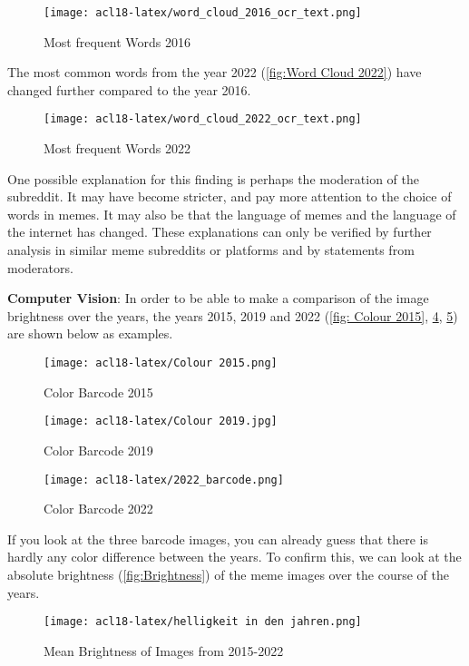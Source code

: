 \documentclass[11pt,a4paper]{article}
\begin{document}
\begin{figure}[H]
    \centering
    \texttt{[image: acl18-latex/word\_cloud\_2016\_ocr\_text.png]}
    \caption{Most frequent Words 2016}
    \label{fig:Word Cloud 2019}
\end{figure}

The most common words from the year 2022 (\autoref{fig:Word Cloud 2022}) have changed further compared to the year 2016.
\begin{figure}[H]
    \centering
    \texttt{[image: acl18-latex/word\_cloud\_2022\_ocr\_text.png]}
    \caption{Most frequent Words 2022}
    \label{fig:Word Cloud 2022}
\end{figure}

One possible explanation for this finding is perhaps the moderation of the subreddit. It may have become stricter, and pay more attention to the choice of words in memes. It may also be that the language of memes and the language of the internet has changed.
These explanations can only be verified by further analysis in similar meme subreddits or platforms and by statements from moderators.
\newline \par \textbf{Computer Vision}: In order to be able to make a comparison of the image brightness over the years, the years 2015, 2019 and 2022 (\autoref{fig: Colour 2015}, \ref{fig: Colour 2019}, \ref{fig: Colour 2022}) are shown below as examples.
\begin{figure}[H]
    \centering
    \texttt{[image: acl18-latex/Colour 2015.png]}
    \caption{Color Barcode 2015}
    \label{fig: Colour 2015}
\end{figure}
\begin{figure}[H]
    \centering
    \texttt{[image: acl18-latex/Colour 2019.jpg]}
    \caption{Color Barcode 2019}
    \label{fig: Colour 2019}
\end{figure}
\begin{figure}[H]
    \centering
    \texttt{[image: acl18-latex/2022\_barcode.png]}
    \caption{Color Barcode 2022}
    \label{fig: Colour 2022}
\end{figure}
If you look at the three barcode images, you can already guess that there is hardly any color difference between the years. To confirm this, we can look at the absolute brightness (\autoref{fig:Brightness}) of the meme images over the course of the years.
\begin{figure}[H]
    \centering
    \texttt{[image: acl18-latex/helligkeit in den jahren.png]}
    \caption{Mean Brightness of Images from 2015-2022}
    \label{fig:Brightness}
\end{figure}
\end{document}
